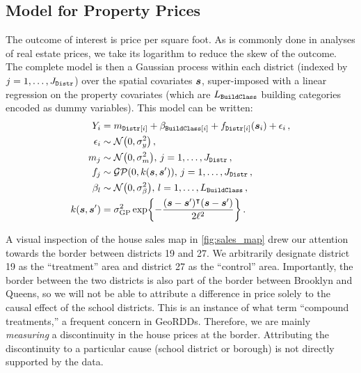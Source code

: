 \subsection{Model for Property Prices}
The outcome of interest is price per square foot.
As is commonly done in analyses of real estate prices, we take its logarithm to reduce the skew of the outcome.
The complete model is then a Gaussian process within each district (indexed by \(j=1,\dotsc,J_{\mathtt{Distr}}\)) over the spatial covariates \(\bm{s}\), super-imposed with a linear regression on the property covariates (which are \(L_{\mathtt{BuildClass}}\) building categories encoded as dummy variables).
This model can be written:
\begin{equation}
    \begin{split}
        Y_i &= %
        m_{\district\sbr{i}} + \beta_{\building\sbr{i}}
        + f_{\district\sbr{i}}(\svec_i) + \epsilon_i \,,
        \\
        \epsilon_i &\sim \normal\del{0, \sigma_y^2} \,, \\
        m_{j} &\sim \normal\del{0, \sigmamu^2},\,j=1,\dotsc,J_\district \,, \\
        f_j &\sim \GP\del{0, k(\svec, \svec')},\,j=1,\dotsc,J_\district \,, \\
        \beta_{l} &\sim \normal\del{0, \sigma_\beta^2},\,l=1,\dotsc,L_\building \,, \\
        k(\svec, \svec') &= \sigmaf^2 \exp\cbr{ - \frac{(\svec-\svec')\trans(\svec-\svec')}{2\ell^2}} \,.
    \end{split}
    \label{eq:nyc_model}
\end{equation}

A visual inspection of the house sales map in \autoref{fig:sales_map} drew our attention towards the border between districts 19 and 27.
We arbitrarily designate district 19 as the ``treatment'' area and district 27 as the ``control'' area.
Importantly, the border between the two districts is also part of the border between Brooklyn and Queens, so we will not be able to attribute a difference in price solely to the causal effect of the school districts.
This is an instance of what \cite{keele_titiunik_2015} term ``compound treatments,'' a frequent concern in GeoRDDs.
Therefore, we are mainly \emph{measuring} a discontinuity in the house prices at the border.
Attributing the discontinuity to a particular cause (school district or borough) is not directly supported by the data.


